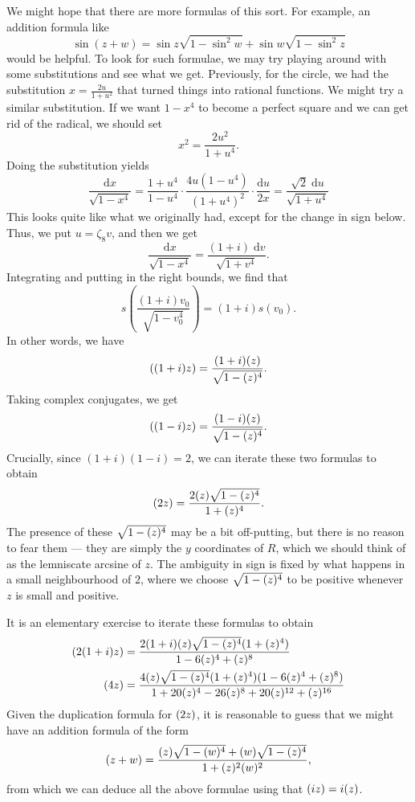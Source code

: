\documentclass{shortart}
\theoremstyle{definition}
\renewcommand\d{\mathrm{d}}
\let\sl\relax
\DeclareMathOperator\sl{sl}
\begin{document}
We might hope that there are more formulas of this sort. For example, an addition formula like
\[
  \sin(z + w) = \sin z \sqrt{1 - \sin^2 w} + \sin w \sqrt{1 - \sin^2 z}
\]
would be helpful. To look for such formulae, we may try playing around with some substitutions and see what we get. Previously, for the circle, we had the substitution $x = \frac{2u}{1 + u^2}$ that turned things into rational functions. We might try a similar substitution. If we want $1 - x^4$ to become a perfect square and we can get rid of the radical, we should set
\[
  x^2 = \frac{2u^2}{1 + u^4}.
\]
Doing the substitution yields
\[
  \frac{\d x}{\sqrt{1 - x^4}} = \frac{1 + u^4}{1 - u^4} \cdot \frac{4u(1 - u^4)}{(1 + u^4)^2} \cdot \frac{\d u}{2x} = \frac{\sqrt{2}\;\d u}{\sqrt{1 + u^4}}
\]
This looks quite like what we originally had, except for the change in sign below. Thus, we put $u = \zeta_8 v$, and then we get
\[
  \frac{\d x}{\sqrt{1 - x^4}} = \frac{(1 + i)\;\d v}{\sqrt{1 + v^4}}.
\]
Integrating and putting in the right bounds, we find that
\[
  s\left(\frac{(1 + i) v_0}{\sqrt{1 - v_0^4}}\right) = (1 + i) s(v_0).
\]
In other words, we have
\[
  \sl((1 + i)z) = \frac{(1 + i) \sl(z)}{\sqrt{1 - \sl(z)^4}}.
\]
Taking complex conjugates, we get
\[
  \sl((1 - i)z) = \frac{(1 - i) \sl(z)}{\sqrt{1 - \sl(z)^4}}.
\]
Crucially, since $(1 + i)(1 - i) = 2$, we can iterate these two formulas to obtain
\[
  \sl(2z) = \frac{2\sl(z)\sqrt{1 - \sl(z)^4}}{1 + \sl(z)^4}.
\]
The presence of these $\sqrt{1 - \sl(z)^4}$ may be a bit off-putting, but there is no reason to fear them --- they are simply the $y$ coordinates of $R$, which we should think of as the lemniscate arcsine of $z$. The ambiguity in sign is fixed by what happens in a small neighbourhood of $2$, where we choose $\sqrt{1 - \sl(z)^4}$ to be positive whenever $z$ is small and positive.

It is an elementary exercise to iterate these formulas to obtain
\[
  \begin{aligned}
    \sl(2(1 + i)z) &= \frac{2(1 + i) \sl(z) \sqrt{1 - \sl(z)^4} (1 + \sl(z)^4)}{1 - 6 \sl(z)^4 + \sl(z)^8}\\
    \sl(4z) &= \frac{4\sl(z) \sqrt{1 - \sl(z)^4} (1 + \sl(z)^4) (1 - 6 \sl(z)^4 + \sl(z)^8)}{1 + 20 \sl(z)^4 - 26 \sl(z)^8 + 20 \sl(z)^{12} + \sl(z)^{16}}
  \end{aligned}
\]
Given the duplication formula for $\sl(2z)$, it is reasonable to guess that we might have an addition formula of the form
\[
  \sl(z + w) = \frac{\sl(z) \sqrt{1 - \sl(w)^4} + \sl(w) \sqrt{1 - \sl(z)^4}}{1 + \sl(z)^2 \sl(w)^2},
\]
from which we can deduce all the above formulae using that $\sl(iz) = i \sl(z)$.
\end{document}
